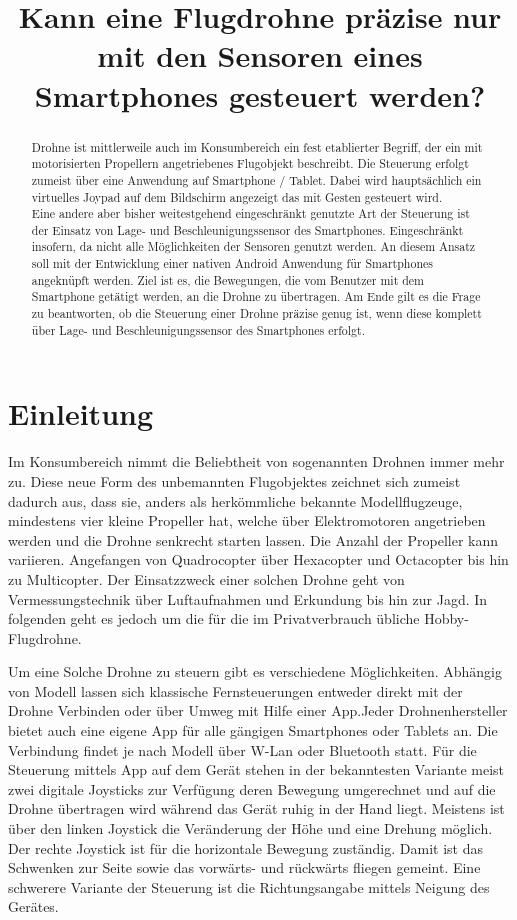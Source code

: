 \documentclass{article}
\title{Kann eine Flugdrohne präzise nur mit den Sensoren eines Smartphones gesteuert werden?}
\begin{document}
\maketitle
\begin{abstract}
\glqq Drohne\grqq{} ist mittlerweile auch im Konsumbereich ein fest etablierter Begriff, der ein mit motorisierten Propellern angetriebenes Flugobjekt beschreibt. Die Steuerung erfolgt zumeist über eine Anwendung auf Smartphone / Tablet. Dabei wird hauptsächlich ein virtuelles Joypad auf dem Bildschirm angezeigt das mit Gesten gesteuert wird.\\ Eine andere aber bisher weitestgehend eingeschränkt genutzte Art der Steuerung ist der Einsatz von Lage- und Beschleunigungssensor des Smartphones. Eingeschränkt insofern, da nicht alle Möglichkeiten der Sensoren genutzt werden. An diesem Ansatz soll mit der Entwicklung einer nativen Android Anwendung für Smartphones angeknüpft werden. Ziel ist es, die Bewegungen, die vom Benutzer mit dem Smartphone getätigt werden, an die Drohne zu übertragen. Am Ende gilt es die Frage zu beantworten, ob die Steuerung einer Drohne präzise genug ist, wenn diese komplett über Lage- und Beschleunigungssensor des Smartphones erfolgt.

\end{abstract}

\section{Einleitung}
\label{sec:einleitung}
Im Konsumbereich nimmt die Beliebtheit von sogenannten Drohnen immer mehr zu. Diese neue Form des unbemannten Flugobjektes zeichnet sich zumeist dadurch aus, dass sie, anders als herkömmliche bekannte Modellflugzeuge, mindestens vier kleine Propeller hat, welche über Elektromotoren angetrieben werden und die Drohne senkrecht starten lassen. Die Anzahl der Propeller kann variieren. Angefangen von Quadrocopter über Hexacopter und Octacopter bis hin zu Multicopter. Der Einsatzzweck einer solchen Drohne geht von Vermessungstechnik über Luftaufnahmen und Erkundung bis hin zur Jagd. In folgenden geht es jedoch um die für die im Privatverbrauch übliche Hobby-Flugdrohne.

Um eine Solche Drohne zu steuern gibt es verschiedene Möglichkeiten. Abhängig von Modell lassen sich klassische Fernsteuerungen\cite{flypad} entweder direkt mit der Drohne Verbinden oder über Umweg mit Hilfe einer App.Jeder Drohnenhersteller bietet auch eine eigene App für alle gängigen Smartphones oder Tablets an. Die Verbindung findet je nach Modell über W-Lan oder Bluetooth statt. Für die Steuerung mittels App auf dem Gerät stehen in der bekanntesten Variante meist zwei digitale Joysticks zur Verfügung deren Bewegung umgerechnet und auf die Drohne übertragen wird während das Gerät ruhig in der Hand liegt. Meistens ist über den linken Joystick die Veränderung der Höhe und eine Drehung möglich. Der rechte Joystick ist für die horizontale Bewegung zuständig. Damit ist das Schwenken zur Seite sowie das vorwärts- und rückwärts fliegen gemeint. Eine schwerere Variante der Steuerung ist die Richtungsangabe mittels Neigung des Gerätes.
\end{document}
